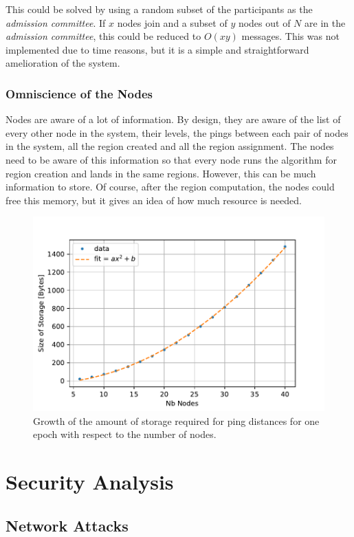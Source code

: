 \documentclass[a4paper,11pt,twoside=semi,openright]{report}
\begin{document}
This could be solved by using a random subset of the participants as the
\textit{admission committee}. If $x$ nodes join and a subset of $y$ nodes out
of $N$ are in the  \textit{admission committee}, this could be reduced to
$O(xy)$ messages. This was not implemented due to time reasons, but it is a
simple and straightforward amelioration of the system. 
 
\subsubsection{Omniscience of the Nodes}
Nodes are aware of a lot of information. By design, they are aware of
the list of every other node in the system, their levels, the pings between
each pair of nodes in the system, all the region created and all the region
assignment. The nodes need to be aware of this information so that
every node runs the algorithm for region creation and lands in the same
regions. However, this can be much information to store. Of course, after the
region computation, the nodes could free this memory, but it gives an idea of
how much resource is needed.

\begin{figure}[!h] 
\centering
\includegraphics[width=350pt]{figures/storage-plot}
\caption{Growth of the amount of storage required for ping distances for one
    epoch with respect to the number of nodes. } \label{fig:storage-plot}
\end{figure}

\section{Security Analysis}
\subsection{Network Attacks} 
\end{document}
